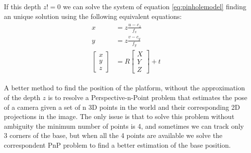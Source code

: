 If this depth $z!=0$ we can  solve the system of equation \ref{eq:pinholemodel} finding an unique solution using the following equivalent equations:
\begin{align}
\begin{split}
x &= z\frac{u-c_x}{f_x}\\[10pt]
y &= z\frac{v-c_y}{f_y}\\[10pt]
{\begin{bmatrix}
x \\[10pt]
y \\[10pt]
z
\end{bmatrix}} &= 
R {\begin{bmatrix}
X \\[10pt]
Y \\[10pt]
Z
\end{bmatrix}} + t
\end{split}
\end{align}

A better method to find the position of the platform, without the approximation of the depth $z$ is to resolve a Perspective-n-Point problem  \cite{quan1999linear}
that estimates the pose of a camera given a set of n 3D points in the world and their corresponding 2D projections in the image. The only issue is that to solve this problem without ambiguity the minimum number of points is 4, and sometimes we can track only 3 corners of the base, but when all the 4 points are available we solve the correspondent PnP problem to find a better estimation of the base position.\\

